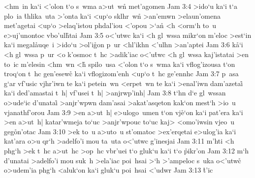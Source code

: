 <hm~in
ka`i
<'olon
t`o
s~wma
a>ut~wn\r{}
met'agomen\bibvsend
\vs Jam 3:4
>ido`u
ka`i
t`a
plo~ia
\r{t}hlika~uta
>'onta
ka`i
<up`o
sklhr~wn\r{}
>an'emwn
>elaun'omena
met'agetai
<up`o
>elaq'istou
phdal'iou
<'opou
>`a\r{n}
<h
<orm`h
to~u
e>uj'unontoc
vbo'ul\r{h}tai\bibvsend
{}
\vs Jam 3:5
o<'utwc
ka`i
<h
gl~wssa
mikr`on
m'eloc
>est`in
ka`i
megal\r{a}uqe~i
>ido`u
>ol'i\r{g}on
p~ur
<hl'ikhn
<'ulhn
>an'aptei\bibvsend
\vs Jam 3:6
k\r{a}`i
<h
gl~wssa
p~ur
<o
k'osmoc
t~hc
>adik'iac
o<'u\r{t}wc
<h
gl~wssa
kaj'istatai
>en
to~ic
m'elesin
<hm~wn
<h\r{}
spilo~usa
<'olon
t`o
s~wma
ka`i
vflog'izousa
t`on
troq`on
t~hc
gen'esew\r{c}
ka`i
vflogizom'enh
<up`o
t~hc
ge'ennhc\bibvsend
\vs Jam 3:7
p~asa
g`ar
vf'usic
vjhr'iwn
te
ka`i
petein~wn
<erpet~wn
te
ka`i
>enal'iwn
dam'azetai\r{}
ka`i
ded'amastai
t~h|
vf'usei
t~h|
>anjrwp'inh|\bibvsend
\vs Jam 3:8
t`hn
d`e
gl~wssan
o>ude`ic
d'unatai\r{}
>anjr'wpwn
dam'asai
>akat'asqeton
kak`on
mest`h
>io~u
vjanathf'orou\bibvsend
\vs Jam 3:9
>en
a>ut~h|
e>ulogo~umen
t`on
vj\r{e}`on
ka`i
pat'era
ka`i
>en
a>ut~h|
katar'wmeja
to`uc
>anjr'wpouc
to`uc
kaj>
<omo'iwsin
vjeo~u
geg\r{o}n'otac\bibvsend
{}
\vs Jam 3:10
>ek
to~u
a>uto~u
st'omatoc
>ex'erqetai
e>ulog'ia
ka`i
kat'ara
o>u
qr`h
>adelfo'i
mou
ta~uta
o<'utwc
g'inesjai\bibvsend
\vs Jam 3:11
m'hti
<h
phg`h
>ek
t~hc
a>ut~hc
>op~hc
vbr'uei
t`o
gluk`u
ka`i
t`o
\r{p}ikr'on\bibvsend
{}
\vs Jam 3:12
m`h
d'unatai
>adelfo'i
mou
suk~h
>ela'iac
poi~hsai
>`h
>'ampeloc
s~uka
o<'utwc\r{}
o>udem'ia
phg`h
<aluk`on
ka`i
gluk`u
poi~hsai
<'udwr\bibvsend
\vs Jam 3:13
\r{t}'ic
